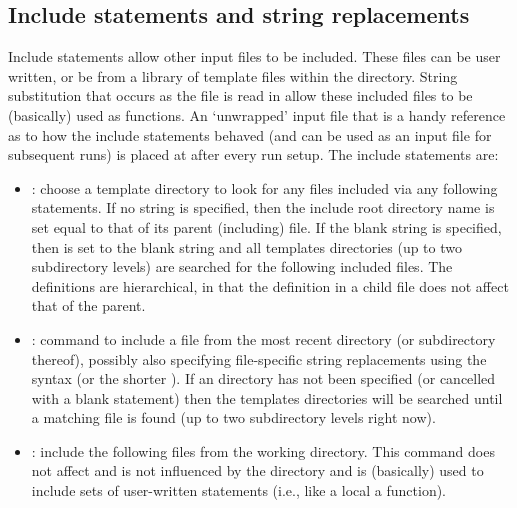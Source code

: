 \subsection{Include statements and string replacements}

Include statements allow other  input files to be included.  These files can be user written, or be from a library of template files within the  directory.  String substitution that occurs as the file is read in allow these included files to be (basically) used as functions.  An `unwrapped' input file that is a handy reference as to how the include statements behaved (and can be used as an input file for subsequent runs) is placed at  after every run setup.  The include statements are:

\begin{itemize}
\item {}: choose a template directory to look for any files included via any following  statements.  If no string is specified, then the include root directory name is set equal to that of its parent (including) file.  If the blank string is specified, then  is set to the blank string and all templates directories (up to two subdirectory levels) are searched for the following included files.  The  definitions are hierarchical, in that the definition in a child file does not affect that of the parent.
\item {}: command to include a file from the most recent  directory (or subdirectory thereof), possibly also specifying file-specific string replacements using the syntax  (or the shorter ).  If an  directory has not been specified (or cancelled with a blank  statement) then the templates directories will be searched until a matching  file is found (up to two subdirectory levels right now).
\item {}: include the following files from the working directory.  This command does not affect and is not influenced by the  directory and is (basically) used to include sets of user-written statements (i.e., like a local a function).
\end{itemize}

